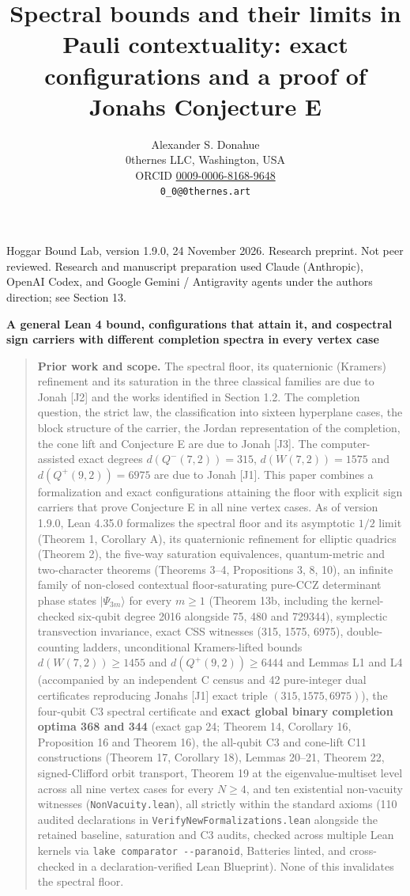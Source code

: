 \documentclass[11pt,a4paper]{article}
\title{Spectral bounds and their limits in Pauli contextuality: exact configurations and a proof of Jonah\textquotesingle s Conjecture E}
\author{Alexander S. Donahue\\0thernes LLC, Washington, USA\\ORCID \href{https://orcid.org/0009-0006-8168-9648}{0009-0006-8168-9648}\\\texttt{0\_0@0thernes.art}}
\date{}
\begin{document}
\maketitle

Hoggar Bound Lab, version 1.9.0, 24 November 2026. Research preprint. Not peer reviewed.
Research and manuscript preparation used Claude (Anthropic), OpenAI Codex, and Google Gemini / Antigravity agents under the author\textquotesingle s direction; see Section 13.

\textbf{A general Lean 4 bound, configurations that attain it, and cospectral sign carriers with different completion spectra in every vertex case}

\begin{quote}
\textbf{Prior work and scope.} The spectral floor, its quaternionic (Kramers) refinement and its saturation in
the three classical families are due to Jonah {[}J2{]} and the works identified in Section 1.2. The completion
question, the strict law, the classification into sixteen hyperplane cases, the block structure of the
carrier, the Jordan representation of the completion, the cone lift and Conjecture E are due to Jonah {[}J3{]}.
The computer-assisted exact degrees \(d(Q^-(7,2))=315\), \(d(W(7,2))=1575\) and \(d(Q^+(9,2))=6975\) are due to
Jonah {[}J1{]}. This paper combines a formalization and exact configurations attaining the floor with explicit
sign carriers that prove Conjecture E in all nine vertex cases. As of version 1.9.0, Lean 4.35.0 formalizes
the spectral floor and its asymptotic \(1/2\) limit (Theorem 1, Corollary A), its quaternionic refinement
for elliptic quadrics (Theorem 2), the five-way saturation equivalences, quantum-metric and two-character
theorems (Theorems 3--4, Propositions 3, 8, 10), an infinite family of non-closed contextual floor-saturating
pure-CCZ determinant phase states \(|\Psi_{3m}\rangle\) for every \(m\ge1\) (Theorem 13b, including the
kernel-checked six-qubit degree 2016 alongside 75, 480 and 729344), symplectic transvection invariance,
exact CSS witnesses (315, 1575, 6975), double-counting ladders, unconditional Kramers-lifted bounds
\(d(W(7,2))\ge1455\) and \(d(Q^+(9,2))\ge6444\) and Lemmas L1 and L4 (accompanied by an independent C census
and 42 pure-integer dual certificates reproducing Jonah\textquotesingle s {[}J1{]} exact triple \((315,1575,6975)\)), the
four-qubit C3 spectral certificate and \textbf{exact global binary completion optima 368 and 344} (exact gap
24; Theorem 14, Corollary 16, Proposition 16\textquotesingle{} and Theorem 16\textquotesingle\textquotesingle), the all-qubit C3 and cone-lift C11
constructions (Theorem 17, Corollary 18), Lemmas 20--21, Theorem 22, signed-Clifford orbit transport,
Theorem 19 at the eigenvalue-multiset level across all nine vertex cases for every \(N\ge4\), and ten
existential non-vacuity witnesses (\texttt{NonVacuity.lean}), all strictly within the standard axioms (110
audited declarations in \nolinkurl{VerifyNewFormalizations.lean} alongside the retained baseline, saturation and C3
audits, checked across multiple Lean kernels via \texttt{lake\ comparator\ -\/-paranoid}, Batteries linted, and
cross-checked in a declaration-verified Lean Blueprint). None of this invalidates the spectral floor.
\end{quote}
\end{document}
